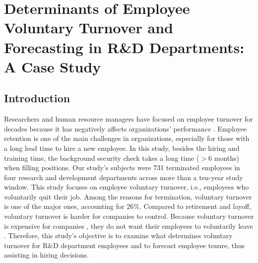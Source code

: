 \chapter{Determinants of Employee Voluntary Turnover and Forecasting in R\&D Departments: A Case Study} \label{ch:4}
\section{Introduction}
Researchers and human resource managers have focused on employee turnover for decades because it has negatively affects organizations’ performance \citep{shaw2011}. Employee retention is one of the main challenges in organizations, especially for those with a long lead time to hire a new employee. In this study, besides the hiring and training time, the background security check takes a long time ($>6$ months) when filling positions. Our study’s subjects were 731 terminated employees in four research and development departments across more than a ten-year study window. This study focuses on employee voluntary turnover, i.e., employees who voluntarily quit their job. Among the reasons for termination, voluntary turnover is one of the major ones, accounting for 26\%. Compared to retirement and layoff, voluntary turnover is harder for companies to control. Because voluntary turnover is expensive for companies \citep{selden2000}, they do not want their employees to voluntarily leave \citep{allen2010}. Therefore, this study’s objective is to examine what determines voluntary turnover for R\&D department employees and to forecast employee tenure, thus assisting in hiring decisions. 

